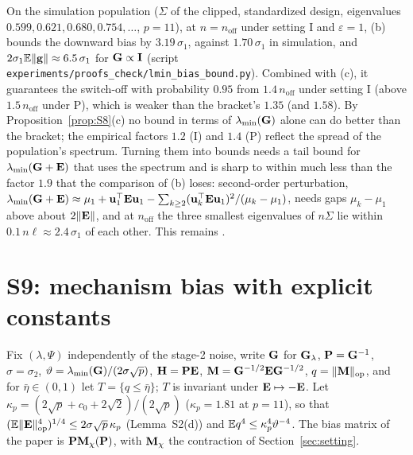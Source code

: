 \begin{remark}\label{rem:S8open}
On the simulation population ($\Sigma$ of the clipped, standardized design, eigenvalues $0.599,0.621,0.680,0.754,\dots$, $p=11$), at $n=n_{\mathrm{off}}$ under setting I and $\varepsilon=1$, (b) bounds the downward bias by $3.19\,\sigma_1$, against $1.70\,\sigma_1$ in simulation, and $2\sigma_1\mathbb{E}\|\mathbf{g}\|\approx6.5\,\sigma_1$ for $\mathbf{G}\propto\mathbf{I}$ (script \texttt{experiments/proofs\_check/lmin\_bias\_bound.py}). Combined with (c), it guarantees the switch-off with probability $0.95$ from $1.4\,n_{\mathrm{off}}$ under setting I (above $1.5\,n_{\mathrm{off}}$ under P), which is weaker than the bracket's $1.35$ (and $1.58$). By Proposition~\ref{prop:S8}(c) no bound in terms of $\lambda_{\min}(\mathbf{G})$ alone can do better than the bracket; the empirical factors $1.2$ (I) and $1.4$ (P) reflect the spread of the population's spectrum. Turning them into bounds needs a tail bound for $\lambda_{\min}(\mathbf{G}+\mathbf{E})$ that uses the spectrum and is sharp to within much less than the factor $1.9$ that the comparison of (b) loses: second-order perturbation, $\lambda_{\min}(\mathbf{G}+\mathbf{E})\approx\mu_1+\mathbf{u}_1^\top\mathbf{E}\mathbf{u}_1-\sum_{k\ge2}(\mathbf{u}_k^\top\mathbf{E}\mathbf{u}_1)^2/(\mu_k-\mu_1)$, needs gaps $\mu_k-\mu_1$ above about $2\|\mathbf{E}\|$, and at $n_{\mathrm{off}}$ the three smallest eigenvalues of $n\Sigma$ lie within $0.1\,n\ell\approx2.4\,\sigma_1$ of each other. This remains .
\end{remark}

\section{S9: mechanism bias with explicit constants}
\label{sec:S9}

Fix $(\lambda,\Psi)$ independently of the stage-2 noise, write $\mathbf{G}$ for $\mathbf{G}_\lambda$, $\mathbf{P}=\mathbf{G}^{-1}$, $\sigma=\sigma_2$, $\vartheta=\lambda_{\min}(\mathbf{G})/(2\sigma\sqrt p)$, $\mathbf{H}=\mathbf{P}\mathbf{E}$, $\mathbf{M}=\mathbf{G}^{-1/2}\mathbf{E}\mathbf{G}^{-1/2}$, $q=\|\mathbf{M}\|_{\mathrm{op}}$, and for $\bar\eta\in(0,1)$ let $T=\{q\le\bar\eta\}$; $T$ is invariant under $\mathbf{E}\mapsto-\mathbf{E}$. Let $\kappa_p=(2\sqrt p+c_0+2\sqrt2)/(2\sqrt p)$ ($\kappa_p=1.81$ at $p=11$), so that $(\mathbb{E}\|\mathbf{E}\|_{\mathrm{op}}^4)^{1/4}\le2\sigma\sqrt p\,\kappa_p$ (Lemma~S2(d)) and $\mathbb{E} q^4\le\kappa_p^4\vartheta^{-4}$. The bias matrix of the paper is $\mathbf{P}\mathbf{M}_\chi(\mathbf{P})$, with $\mathbf{M}_\chi$ the contraction of Section~\ref{sec:setting}.

